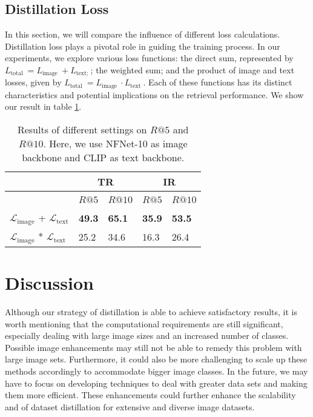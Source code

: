 \documentclass[sigconf, nonacm]{acmart}
\begin{document}
\subsection{Distillation Loss}
In this section, we will compare the influence of different loss calculations. Distillation loss plays a pivotal role in guiding the training process. In our experiments, we explore various loss functions: the direct sum, represented by $L_{\text {total }}=L_{\text {image }}+L_{\text {text; }}$; the weighted sum; and the product of image and text losses, given by $L_{\text {total }}=L_{\text {image }} \cdot L_{\text {text }}$. Each of these functions has its distinct characteristics and potential implications on the retrieval performance. We show our result in table \ref{tab_loss}.

\begin{table}[!h]
    \centering
    \caption{Results of different settings on \( R@5 \) and \( R@10 \). Here, we use NFNet-10 as image backbone and CLIP as text backbone.}
    \label{tab_loss}
    \begin{tabular}{l|l|l|l|l}
    \toprule
        ~ & \multicolumn{2}{c|}{TR} & \multicolumn{2}{c}{IR}  \\ \midrule
        ~ & \( R@5 \) & \( R@10 \) & \( R@5 \) & \( R@10 \)  \\ \midrule
        \( \mathcal{L}_{\text{image}} \) + \( \mathcal{L}_{\text{text}} \) & \textbf{49.3} & \textbf{65.1} & \textbf{35.9} & \textbf{53.5}  \\ 
        \( \mathcal{L}_{\text{image}} \) * \( \mathcal{L}_{\text{text}} \) & 25.2 & 34.6 & 16.3 & 26.4  \\ \midrule
    \end{tabular}
\end{table}





\section{Discussion}

Although our strategy of distillation is able to achieve satisfactory results, it is worth mentioning that the computational requirements are still significant, especially dealing with large image sizes and an increased number of classes. Possible image enhancements may still not be able to remedy this problem with large image sets. Furthermore, it could also be more challenging to scale up these methods accordingly to accommodate bigger image classes. In the future, we may have to focus on developing techniques to deal with greater data sets and making them more efficient. These enhancements could further enhance the scalability and of dataset distillation for extensive and diverse image datasets.  
\end{document}
